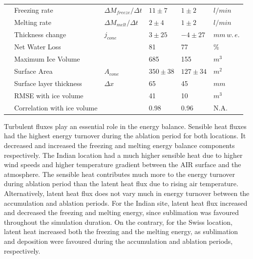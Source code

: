 \documentclass[utf8]{frontiersSCNS}
\begin{document}
\begin{table}
\begin{tabular}{@{}|llllll|@{}}
		                       & Freezing rate                   & ${\Delta M_{freeze}}/{\Delta t}$    & $11 \pm 7$    & $1 \pm 2$     & $l/min$ \\
		\multicolumn{1}{|l|}{} & Melting rate                    & ${\Delta M_{melt}}/{\Delta t}$      & $2 \pm 4$     & $1 \pm 2$     & $l/min$ \\
		\multicolumn{1}{|l|}{} & Thickness change                & $j_{cone}$      & $3 \pm 25$    & $-4 \pm 27$   &
		$mm \, w.\,e.$                                                                                                       \\
		\multicolumn{1}{|l|}{} & Net Water Loss                  &                 & 81            & 77
		                       & \%                                                                                          \\
		\multicolumn{1}{|l|}{} & Maximum Ice Volume              &                 & 685           & 155           & $m^{3}$ \\
		\multicolumn{1}{|l|}{} & Surface Area                    & $A_{cone}$      & $350 \pm 38$  & $127 \pm 34$  & $m^{2}$ \\\midrule
		\multicolumn{1}{|l|}{\multirow{3}{*}{\rotatebox[origin=c]{90}{Model}}}
		                       & Surface layer thickness & $\Delta x$ & 65          & 45            &                $mm$  \\
		\multicolumn{1}{|l|}{} & RMSE with ice volume        &                 & 41            & 10           & $m^{3}$ \\
		\multicolumn{1}{|l|}{} & Correlation with ice volume &                 & 0.98          & 0.96          &
		N.A.                                                                                                                 \\\bottomrule
	\end{tabular}
\end{table}

Turbulent fluxes play an essential role in the energy balance. Sensible heat fluxes had the highest energy
turnover during the ablation period for both locations. It decreased and increased the freezing and melting
energy balance components respectively. The Indian location had a much higher sensible heat due to higher wind speeds and
higher temperature gradient between the AIR surface and the atmosphere. The sensible heat contributes much more
to the energy turnover during ablation period than the latent heat flux due to rising air temperature. Alternatively, latent
heat flux does not vary much in energy turnover between the accumulation and ablation periods. For the Indian
site, latent heat flux increased and decreased the freezing and melting energy, since sublimation was
favoured throughout the simulation duration. On the contrary, for the Swiss location, latent heat increased both
the freezing
and the melting energy, as sublimation and deposition were favoured during the accumulation and ablation
periods, respectively.
\end{document}
